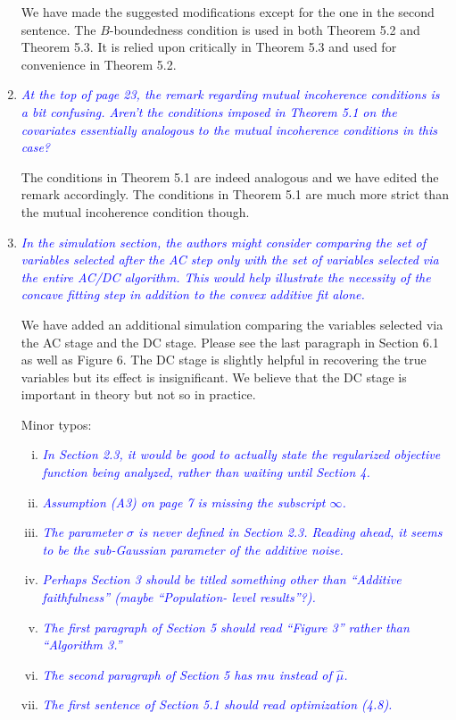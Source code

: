 \documentclass[pdftex,12pt]{article}
\let\hat\widehat
\def\rc#1{{\it\textcolor{blue}{#1}}\smallskip}
\begin{document}
\begin{enumerate}[(1)]
We have made the suggested modifications except for the one in the second sentence. The $B$-boundedness condition is used in both Theorem 5.2 and Theorem 5.3. It is relied upon critically in Theorem 5.3 and used for convenience in Theorem 5.2. 


\item \rc{At the top
of page 23, the remark regarding mutual incoherence conditions is a
bit confusing. Aren’t the conditions imposed in Theorem 5.1 on the
covariates essentially analogous to the mutual incoherence conditions
in this case? }

The conditions in Theorem 5.1 are indeed analogous and we have edited the remark accordingly. The conditions in Theorem 5.1 are much more strict than the mutual incoherence condition though.

\item \rc{In the simulation section, the authors might consider comparing the
set of variables selected after the AC step only with the set of
variables selected via the entire AC/DC algorithm. This would help
illustrate the necessity of the concave fitting step in addition to
the convex additive fit alone.}

We have added an additional simulation comparing the variables selected via the AC stage and the DC stage. Please see the last paragraph in Section 6.1 as well as Figure 6. The DC stage is slightly helpful in recovering the true variables but its effect is insignificant. We believe that the DC stage is important in theory but not so in practice. 

Minor typos:
\begin{enumerate}[(i)]
\item \rc{In Section 2.3, it would be good to actually state the regularized
objective function being analyzed, rather than waiting until Section
4.}
\item \rc{Assumption (A3) on page 7 is missing the subscript $\infty$.}
\item \rc{The parameter $\sigma$ is never defined in Section 2.3. Reading ahead,
it seems to be the sub-Gaussian parameter of the additive noise.}
\item \rc{Perhaps Section 3 should be titled something other than ``Additive
faithfulness'' (maybe ``Population- level results''?).}
\item \rc{The first paragraph of Section 5 should read
  ``Figure 3'' rather than ``Algorithm 3.''}

\item \rc{The second paragraph of Section 5 has $m\hat{}u$ instead of $\hat\mu$.}
\item \rc{The first sentence of Section 5.1 should read optimization (4.8).}
\end{enumerate}

\end{enumerate}
\end{document}
